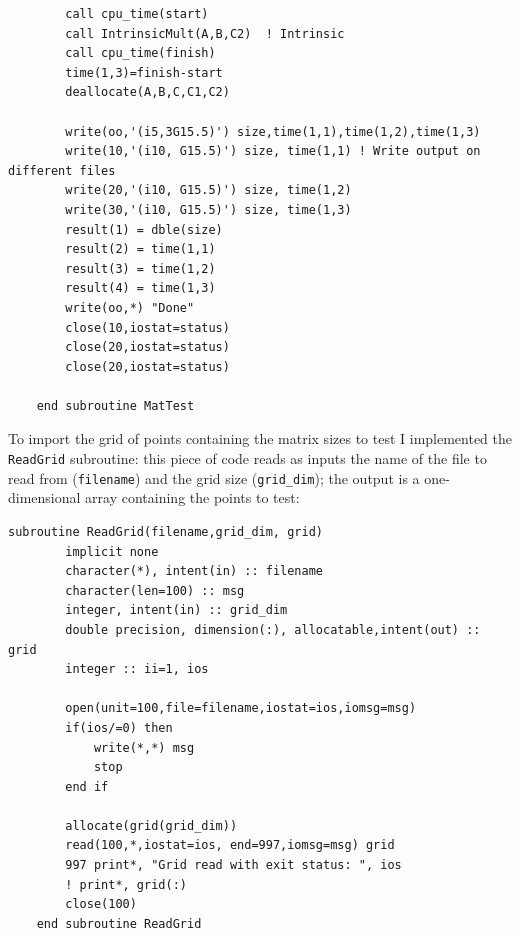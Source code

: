 \documentclass[a4paper]{article}
\begin{document}
\begin{lstlisting}
        call cpu_time(start)
        call IntrinsicMult(A,B,C2)  ! Intrinsic
        call cpu_time(finish)
        time(1,3)=finish-start
        deallocate(A,B,C,C1,C2)          
            
        write(oo,'(i5,3G15.5)') size,time(1,1),time(1,2),time(1,3)
        write(10,'(i10, G15.5)') size, time(1,1) ! Write output on different files
        write(20,'(i10, G15.5)') size, time(1,2)
        write(30,'(i10, G15.5)') size, time(1,3)
        result(1) = dble(size)
        result(2) = time(1,1)
        result(3) = time(1,2)
        result(4) = time(1,3)
        write(oo,*) "Done"
        close(10,iostat=status)
        close(20,iostat=status)
        close(20,iostat=status)

    end subroutine MatTest
\end{lstlisting}

\noindent To import the grid of points containing the matrix sizes to test I implemented the \lstinline{ReadGrid} subroutine: this piece of code reads as inputs the name of the file to read from (\lstinline{filename}) and the grid size (\lstinline{grid_dim}); the output is a one-dimensional array containing the points to test:

\begin{lstlisting}
subroutine ReadGrid(filename,grid_dim, grid)
        implicit none
        character(*), intent(in) :: filename
        character(len=100) :: msg
        integer, intent(in) :: grid_dim
        double precision, dimension(:), allocatable,intent(out) :: grid
        integer :: ii=1, ios

        open(unit=100,file=filename,iostat=ios,iomsg=msg)
        if(ios/=0) then
            write(*,*) msg
            stop
        end if

        allocate(grid(grid_dim))
        read(100,*,iostat=ios, end=997,iomsg=msg) grid 
        997 print*, "Grid read with exit status: ", ios
        ! print*, grid(:)
        close(100)
    end subroutine ReadGrid
\end{lstlisting}
\end{document}
